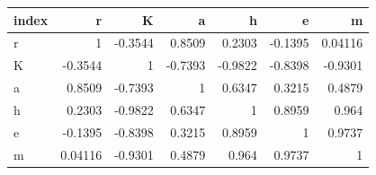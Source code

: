 \begin{tabular}{lrrrrrr}
\toprule
index & r & K & a & h & e & m \\
\midrule
r & 1 & -0.3544 & 0.8509 & 0.2303 & -0.1395 & 0.04116 \\
K & -0.3544 & 1 & -0.7393 & -0.9822 & -0.8398 & -0.9301 \\
a & 0.8509 & -0.7393 & 1 & 0.6347 & 0.3215 & 0.4879 \\
h & 0.2303 & -0.9822 & 0.6347 & 1 & 0.8959 & 0.964 \\
e & -0.1395 & -0.8398 & 0.3215 & 0.8959 & 1 & 0.9737 \\
m & 0.04116 & -0.9301 & 0.4879 & 0.964 & 0.9737 & 1 \\
\bottomrule
\end{tabular}
